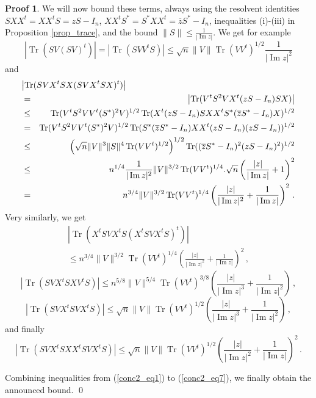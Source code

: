 \documentclass[11pt,a4paper]{article}
\DeclareMathOperator{\1}{\mathbf{1}}
\DeclareMathOperator{\Imag}{\mathrm{Im}}
\DeclareMathOperator{\Tr}{\mathrm{Tr}}
\theoremstyle{definition}
\newtheorem*{Proof}{Proof}
\begin{document}
\begin{Proof}
We will now bound these terms, always using the resolvent identities $SXX^t=XX^tS=zS-I_n$, $XX^tS^* = S^*XX^t = \overline{z}S^*-I_n$, inequalities (i)-(iii) in Proposition \ref{prop_trace}, and the bound $\|S\| \le \frac{1}{|\Imag z|}$. We get for example
\begin{equation} \label{conc2_eq2}
\left| \Tr(SV(SV)^t) \right| = \left| \Tr(SVV^tS) \right| \le \sqrt{n} \|V\| \Tr(VV^t)^{1/2} \frac{1}{|\Imag z|^2}
\end{equation}
and
\begin{eqnarray} \label{conc2_eq3}
\lefteqn{   \left| \Tr(SVX^tSX(SVX^tSX)^t) \right|   } \nonumber \\
& = & \left| \Tr(V^tS^2VX^t(zS-I_n)SX) \right| \nonumber \\
& \le & \Tr(V^tS^2VV^t(S^*)^2V)^{1/2} \Tr(X^t(zS-I_n)SXX^tS^*(\overline{z}S^*-I_n)X)^{1/2} \nonumber \\
& = & \Tr(V^tS^2VV^t(S^*)^2V)^{1/2} \Tr(S^*(\overline{z}S^*-I_n)XX^t(zS-I_n)(zS-I_n))^{1/2} \nonumber \\
& \le & \left( \sqrt{n} \|V\|^3 \|S\|^4 \Tr(VV^t)^{1/2} \right)^{1/2} \Tr((\overline{z}S^*-I_n)^2(zS-I_n)^2)^{1/2} \nonumber \\
& \le & n^{1/4} \frac{1}{|\Imag z|^2} \|V\|^{3/2} \Tr(VV^t)^{1/4} . \sqrt{n} \left( \frac{|z|}{|\Imag z|} + 1 \right)^2 \nonumber \\
& = & n^{3/4} \|V\|^{3/2} \Tr(VV^t)^{1/4} \left( \frac{|z|}{|\Imag z|^2} + \frac{1}{|\Imag z|} \right)^2 \, .
\end{eqnarray}
Very similarly, we get
\begin{multline} \label{conc2_eq4}
\left| \Tr(X^tSVX^tS(X^tSVX^tS)^t) \right| \\
\le n^{3/4} \|V\|^{3/2} \Tr(VV^t)^{1/4} \left( \frac{|z|}{|\Imag z|^2} + \frac{1}{|\Imag z|} \right)^2 \, ,
\end{multline}
\begin{equation} \label{conc2_eq5}
\left| \Tr(SVX^tSXV^tS) \right| \le n^{5/8} \|V\|^{5/4} \Tr(VV^t)^{3/8} \left( \frac{|z|}{|\Imag z|^3} + \frac{1}{|\Imag z|^2} \right) \, ,
\end{equation}
\begin{equation} \label{conc2_eq6}
\left| \Tr(SVX^tSVX^tS) \right| \le \sqrt{n} \|V\| \Tr(VV^t)^{1/2} \left( \frac{|z|}{|\Imag z|^3} + \frac{1}{|\Imag z|^2} \right) \, ,
\end{equation}
and finally
\begin{equation} \label{conc2_eq7}
\left| \Tr(SVX^tSXX^tSVX^tS) \right| \le \sqrt{n} \|V\| \Tr(VV^t)^{1/2} \left( \frac{|z|}{|\Imag z|^2} + \frac{1}{|\Imag z|} \right)^2 \, .
\end{equation}

Combining inequalities from (\ref{conc2_eq1}) to (\ref{conc2_eq7}), we finally obtain the announced bound. \qed
\end{Proof}
\end{document}

